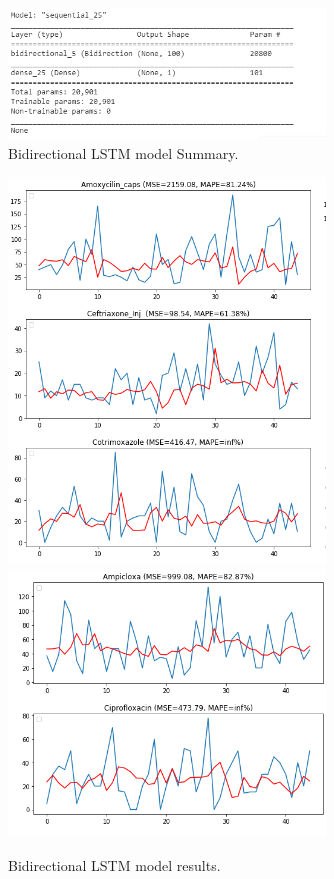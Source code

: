 \documentclass[12pt]{report}
\begin{document}
\begin{figure}[H]%
\begin {center}
\includegraphics[width=0.75\textwidth]{Bidirectional1.png}
\caption{Bidirectional LSTM model Summary.}
\label{fig:ecg}
\end {center}
\end{figure}

\begin{figure}[H]%
\begin {center}
\includegraphics[width=0.75\textwidth]{images/bi (5).png}
\includegraphics[width=0.75\textwidth]{images/bi (6).png}
\caption{Bidirectional LSTM model results.}
\label{fig:ecg}
\end {center}
\end{figure}
\end{document}
